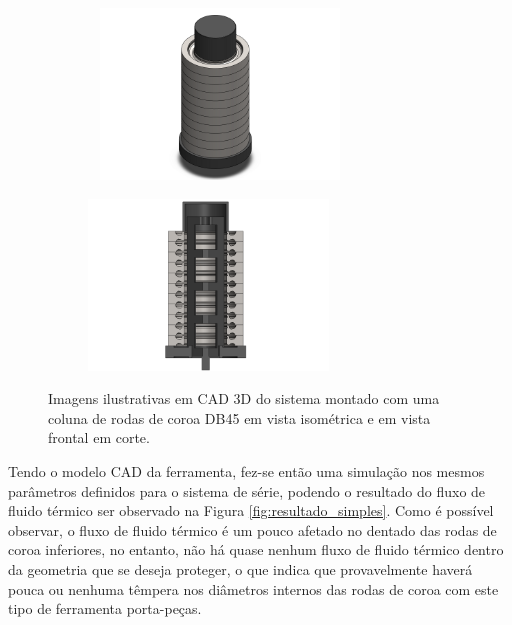 \begin{figure}[htb]
    \centering
    \begin{subfigure}{.5\textwidth}\
        \centering
        \includegraphics[width = 0.7\textwidth]{Figures/Cap3/Coluna_P_Montada.png}
        \caption{}
        \label{fig:simples_montada}
    \end{subfigure}%
    \begin{subfigure}{.5\textwidth}
        \centering
        \includegraphics[width = 0.7\textwidth]{Figures/Cap3/Coluna_P_Montada_Corte.png}
        \caption{}
        \label{fig:simples_corte}
    \end{subfigure}
    \caption[Imagens ilustrativas da proposta inicial montada e em corte.]%
    {Imagens ilustrativas em CAD 3D do sistema montado com uma coluna de rodas de coroa DB45 em vista isométrica e em vista frontal em corte.}
\end{figure}
\par
Tendo o modelo CAD da ferramenta, fez-se então uma simulação nos mesmos parâmetros definidos para o sistema de série, podendo o resultado do fluxo de fluido térmico ser observado na Figura \ref{fig:resultado_simples}. Como é possível observar, o fluxo de fluido térmico é um pouco afetado no dentado das rodas de coroa inferiores, no entanto, não há quase nenhum fluxo de fluido térmico dentro da geometria que se deseja proteger, o que indica que provavelmente haverá pouca ou nenhuma têmpera nos diâmetros internos das rodas de coroa com este tipo de ferramenta porta-peças.
